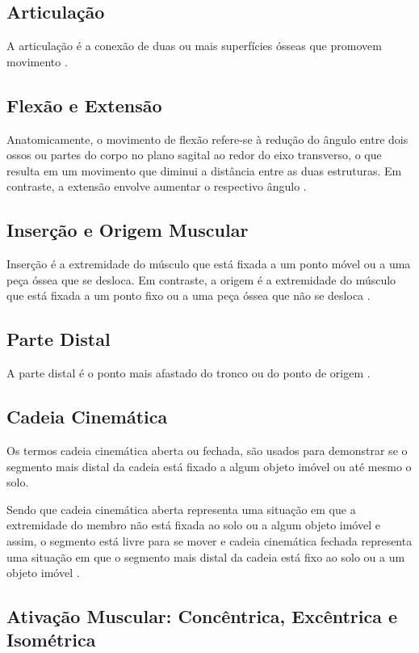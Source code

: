 \subsection[Articulação]{Articulação}
A articulação é a conexão de duas ou mais superfícies ósseas que promovem movimento \cite{articulacao}.


\subsection[Flexão e Extensão]{Flexão e Extensão}
Anatomicamente, o movimento de flexão refere-se à redução do ângulo entre dois ossos ou partes do corpo no plano sagital ao redor do eixo transverso, o que resulta em um movimento que diminui a distância entre as duas estruturas. Em contraste, a extensão envolve aumentar o respectivo ângulo \cite{flexao}.


\subsection[Inserção e Origem Muscular]{Inserção e Origem Muscular}
Inserção é a extremidade do músculo que está fixada a um ponto móvel ou a uma peça óssea que se desloca. Em contraste, a origem é a extremidade do músculo que está fixada a um ponto fixo ou a uma peça óssea que não se desloca \cite{sisMuscular}.


\subsection[Parte Distal]{Parte Distal}
A parte distal é o ponto mais afastado do tronco ou do ponto de origem \cite{distal}.



\subsection[Cadeia Cinemática]{Cadeia Cinemática}
Os termos cadeia cinemática aberta ou fechada, são usados para demonstrar se o segmento mais distal da cadeia está fixado a algum objeto imóvel ou até mesmo o solo.

Sendo que cadeia cinemática aberta representa uma situação em que a extremidade do membro não está fixada ao solo ou a algum objeto imóvel e assim, o segmento está livre para se mover e cadeia cinemática fechada representa uma situação em que o segmento mais distal da cadeia está fixo ao solo ou a um objeto imóvel \cite{silva2015cinesiologia}.


\subsection[Ativação Muscular]{Ativação Muscular: Concêntrica, Excêntrica e Isométrica}

